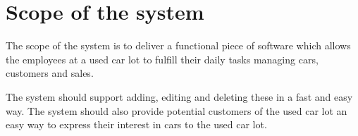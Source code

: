 \section{Scope of the system}
The scope of the system is to deliver a functional piece of software which allows the employees at a used car lot to fulfill their daily tasks managing cars, customers and sales. 

The system should support adding, editing and deleting these in a fast and easy way. The system should also provide potential customers of the used car lot an easy way to express their interest in cars to the used car lot.